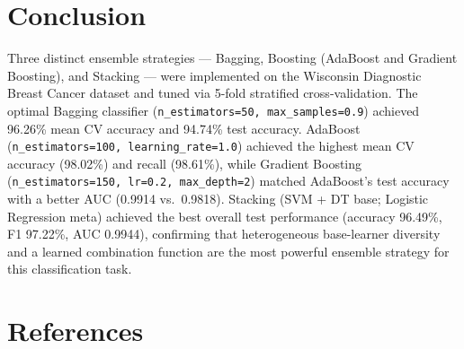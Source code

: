 \documentclass[12pt,a4paper]{article}
\begin{document}
\section{Conclusion}

Three distinct ensemble strategies --- Bagging, Boosting (AdaBoost and Gradient Boosting), and
Stacking --- were implemented on the Wisconsin Diagnostic Breast Cancer dataset and tuned via
5-fold stratified cross-validation. The optimal Bagging classifier
(\texttt{n\_estimators=50, max\_samples=0.9}) achieved 96.26\% mean CV accuracy and 94.74\% test
accuracy. AdaBoost (\texttt{n\_estimators=100, learning\_rate=1.0}) achieved the highest mean CV
accuracy (98.02\%) and recall (98.61\%), while Gradient Boosting (\texttt{n\_estimators=150,
lr=0.2, max\_depth=2}) matched AdaBoost's test accuracy with a better AUC (0.9914 vs.\ 0.9818).
Stacking (SVM + DT base; Logistic Regression meta) achieved the best overall test performance
(accuracy 96.49\%, F1 97.22\%, AUC 0.9944), confirming that heterogeneous base-learner
diversity and a learned combination function are the most powerful ensemble strategy for this
classification task.

\section{References}
\end{document}
